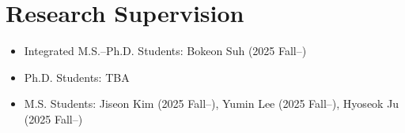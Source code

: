 \section{Research Supervision}

\begin{itemize}[label=$\cdot$]
  \item Integrated M.S.–Ph.D. Students: Bokeon Suh (2025 Fall--)
  \item Ph.D. Students: TBA
  \item M.S. Students: Jiseon Kim (2025 Fall--), Yumin Lee (2025 Fall--), Hyoseok Ju (2025 Fall--)
\end{itemize}